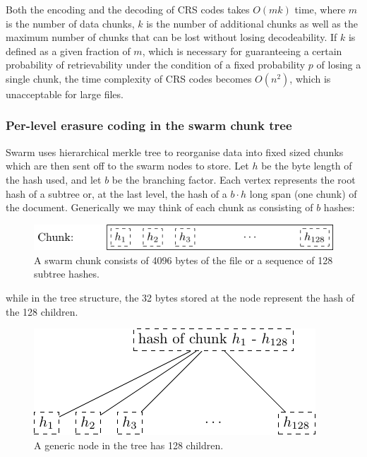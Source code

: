 Both the encoding and the decoding of CRS codes takes $O(mk)$ time, where $m$ is the number of data chunks, $k$ is the number of additional chunks as well as the maximum number of chunks that can be lost without losing decodeability. If $k$ is defined as a given fraction of $m$, which is necessary for guaranteeing a certain probability of retrievability under the condition of a fixed probability $p$ of losing a single chunk, the time complexity of CRS codes becomes $O(n^2)$, which is unacceptable for large files. 

\subsubsection{Per-level erasure coding in the swarm chunk tree}

Swarm uses hierarchical merkle tree \cite{merkle1980protocols} to reorganise data into fixed sized chunks which are then sent off to the swarm nodes to store.
Let $h$ be the byte length of the hash used, and let $b$ be the branching factor. Each vertex represents the root hash of a subtree or, at the last level, the hash of a $b\cdot h$ long span (one chunk) of the document. Generically we may think of each chunk as consisting of $b$ hashes:


\begin{figure}[htbp]
   \centering
   \includegraphics{fig/chunk.pdf} %
   \caption{A swarm chunk consists of 4096 bytes of the file or a sequence of 128 subtree hashes.}
   \label{fig:chunk}
\end{figure}

while in the tree structure, the 32 bytes stored at the node represent the hash of the 128 children.

\begin{figure}[htbp]
   \centering
   \includegraphics{fig/treebasic.pdf} %
   \caption{ A generic node in the tree has 128 children.}
   \label{fig:treebasic}
\end{figure}

